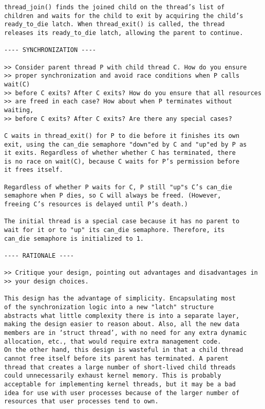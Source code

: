 \begin{appendices}
\begin{verbatim}
thread_join() finds the joined child on the thread’s list of
children and waits for the child to exit by acquiring the child’s
ready_to_die latch. When thread_exit() is called, the thread
releases its ready_to_die latch, allowing the parent to continue.

---- SYNCHRONIZATION ----

>> Consider parent thread P with child thread C. How do you ensure
>> proper synchronization and avoid race conditions when P calls wait(C)
>> before C exits? After C exits? How do you ensure that all resources
>> are freed in each case? How about when P terminates without waiting,
>> before C exits? After C exits? Are there any special cases?

C waits in thread_exit() for P to die before it finishes its own
exit, using the can_die semaphore "down"ed by C and "up"ed by P as
it exits. Regardless of whether whether C has terminated, there
is no race on wait(C), because C waits for P’s permission before
it frees itself.

Regardless of whether P waits for C, P still "up"s C’s can_die
semaphore when P dies, so C will always be freed. (However,
freeing C’s resources is delayed until P’s death.)

The initial thread is a special case because it has no parent to
wait for it or to "up" its can_die semaphore. Therefore, its
can_die semaphore is initialized to 1.

---- RATIONALE ----

>> Critique your design, pointing out advantages and disadvantages in
>> your design choices.

This design has the advantage of simplicity. Encapsulating most
of the synchronization logic into a new "latch" structure
abstracts what little complexity there is into a separate layer,
making the design easier to reason about. Also, all the new data
members are in ‘struct thread’, with no need for any extra dynamic
allocation, etc., that would require extra management code.
On the other hand, this design is wasteful in that a child thread
cannot free itself before its parent has terminated. A parent
thread that creates a large number of short-lived child threads
could unnecessarily exhaust kernel memory. This is probably
acceptable for implementing kernel threads, but it may be a bad
idea for use with user processes because of the larger number of
resources that user processes tend to own.
\end{verbatim}

\end{appendices}